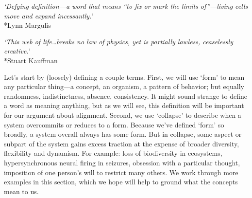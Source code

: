 \documentclass[12pt]{article}
\begin{document}
\begin{center}
\textit{`Defying definition---a word that means ``to fix or mark the limits of''---living cells move and expand incessantly.'}\\*Lynn Margulis
\end{center}

\begin{center}
\textit{`This web of life\ldots breaks no law of physics, yet is partially lawless, ceaselessly \\creative.'}\\*Stuart Kauffman
\end{center}



Let's start by (loosely) defining a couple terms. First, we will use `form' to mean any particular thing---a concept, an organism, a pattern of behavior; but equally randomness, indistinctness, absence, consistency. It might sound strange to define a word as meaning anything, but as we will see, this definition will be important for our argument about alignment. Second, we use `collapse' to describe when a system overcommits or reduces to a form. Because we've defined `form' so broadly, a system overall always has some form. But in collapse, some aspect or subpart of the system gains excess traction at the expense of broader diversity, flexibility and dynamism. For example: loss of biodiversity in ecosystems, hypersynchronous neural firing in seizures, obsession with a particular thought, imposition of one person's will to restrict many others. We work through more examples in this section, which we hope will help to ground what the concepts mean to us.
\end{document}

